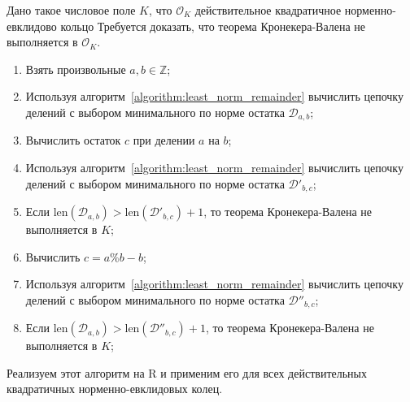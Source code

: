 \documentclass[_00_dissertation.tex]{subfiles}
\begin{document}
\begin{algorithm}\label{algorithm:kronecker_vahlen_special}
    Дано такое числовое поле $K$, что $\mathcal{O}_K$ действительное квадратичное норменно-евклидово кольцо
    Требуется доказать, что теорема Кронекера-Валена не выполняется в $\mathcal{O}_K$.

    \begin{enumerate}
        \item Взять произвольные $a, b \in \mathbb{Z}$;

        \item Используя алгоритм~\ref{algorithm:least_norm_remainder} вычислить цепочку делений с выбором минимального по норме остатка $\mathcal{D}_{a,b}$;

        \item Вычислить остаток $c$ при делении $a$ на $b$;

        \item Используя алгоритм~\ref{algorithm:least_norm_remainder} вычислить цепочку делений с выбором минимального по норме остатка $\mathcal{D}'_{b, c}$;

        \item Если $\textrm{len}(\mathcal{D}_{a, b}) > \textrm{len}(\mathcal{D}'_{b, c}) + 1$, то теорема Кронекера-Валена не выполняется в $K$;

        \item Вычислить $c = a \% b - b$;

        \item Используя алгоритм~\ref{algorithm:least_norm_remainder} вычислить цепочку делений с выбором минимального по норме остатка $\mathcal{D}''_{b,c}$;

        \item Если $\textrm{len}(\mathcal{D}_{a, b}) > \textrm{len}(\mathcal{D}''_{b, c}) + 1$, то теорема Кронекера-Валена не выполняется в $K$;
    \end{enumerate}
\end{algorithm}

Реализуем этот алгоритм на R и применим его для всех действительных квадратичных норменно-евклидовых колец.
\end{document}
